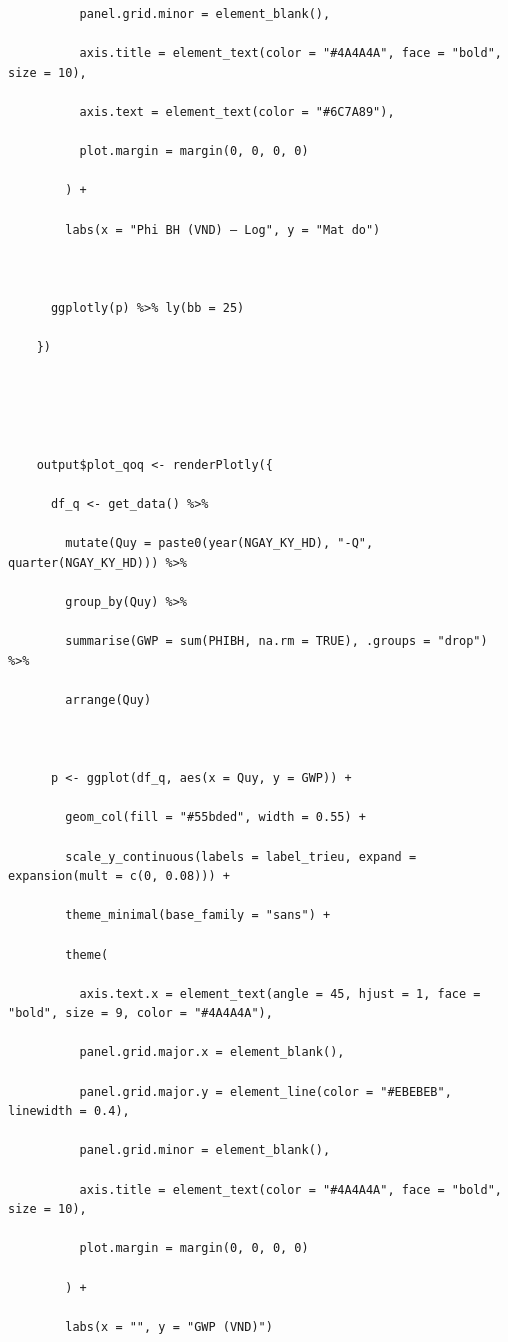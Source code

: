 \documentclass[12pt, a4paper]{article}
\begin{document}
\begin{lstlisting}
          panel.grid.minor = element_blank(),

          axis.title = element_text(color = "#4A4A4A", face = "bold", size = 10),

          axis.text = element_text(color = "#6C7A89"),

          plot.margin = margin(0, 0, 0, 0)

        ) +

        labs(x = "Phi BH (VND) — Log", y = "Mat do")



      ggplotly(p) %>% ly(bb = 25)

    })





    output$plot_qoq <- renderPlotly({

      df_q <- get_data() %>%

        mutate(Quy = paste0(year(NGAY_KY_HD), "-Q", quarter(NGAY_KY_HD))) %>%

        group_by(Quy) %>%

        summarise(GWP = sum(PHIBH, na.rm = TRUE), .groups = "drop") %>%

        arrange(Quy)



      p <- ggplot(df_q, aes(x = Quy, y = GWP)) +

        geom_col(fill = "#55bded", width = 0.55) +

        scale_y_continuous(labels = label_trieu, expand = expansion(mult = c(0, 0.08))) +

        theme_minimal(base_family = "sans") +

        theme(

          axis.text.x = element_text(angle = 45, hjust = 1, face = "bold", size = 9, color = "#4A4A4A"),

          panel.grid.major.x = element_blank(),

          panel.grid.major.y = element_line(color = "#EBEBEB", linewidth = 0.4),

          panel.grid.minor = element_blank(),

          axis.title = element_text(color = "#4A4A4A", face = "bold", size = 10),

          plot.margin = margin(0, 0, 0, 0)

        ) +

        labs(x = "", y = "GWP (VND)")




\end{lstlisting}
\end{document}
